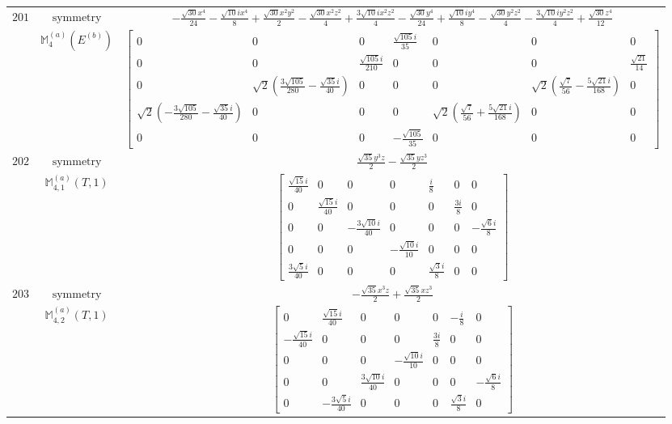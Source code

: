 \documentclass[fleqn,8pt,landscape]{jsarticle}
\begin{document}
\begin{longtable}{ccc}
$ 201 $ & $ \text{symmetry} $ & $ - \frac{\sqrt{30} x^{4}}{24} - \frac{\sqrt{10} i x^{4}}{8} + \frac{\sqrt{30} x^{2} y^{2}}{2} - \frac{\sqrt{30} x^{2} z^{2}}{4} + \frac{3 \sqrt{10} i x^{2} z^{2}}{4} - \frac{\sqrt{30} y^{4}}{24} + \frac{\sqrt{10} i y^{4}}{8} - \frac{\sqrt{30} y^{2} z^{2}}{4} - \frac{3 \sqrt{10} i y^{2} z^{2}}{4} + \frac{\sqrt{30} z^{4}}{12} $ \\
$  $ & $ \mathbb{M}_{4}^{(a)}(E^{(b)}) $ & $ \begin{bmatrix} 0 & 0 & 0 & \frac{\sqrt{105} i}{35} & 0 & 0 & 0 \\ 0 & 0 & \frac{\sqrt{105} i}{210} & 0 & 0 & 0 & \frac{\sqrt{21}}{14} \\ 0 & \sqrt{2} \left(\frac{3 \sqrt{105}}{280} - \frac{\sqrt{35} i}{40}\right) & 0 & 0 & 0 & \sqrt{2} \left(\frac{\sqrt{7}}{56} - \frac{5 \sqrt{21} i}{168}\right) & 0 \\ \sqrt{2} \left(- \frac{3 \sqrt{105}}{280} - \frac{\sqrt{35} i}{40}\right) & 0 & 0 & 0 & \sqrt{2} \left(\frac{\sqrt{7}}{56} + \frac{5 \sqrt{21} i}{168}\right) & 0 & 0 \\ 0 & 0 & 0 & - \frac{\sqrt{105}}{35} & 0 & 0 & 0 \end{bmatrix} $ \\ \hline
$ 202 $ & $ \text{symmetry} $ & $ \frac{\sqrt{35} y^{3} z}{2} - \frac{\sqrt{35} y z^{3}}{2} $ \\
$  $ & $ \mathbb{M}_{4,1}^{(a)}(T,1) $ & $ \begin{bmatrix} \frac{\sqrt{15} i}{40} & 0 & 0 & 0 & \frac{i}{8} & 0 & 0 \\ 0 & \frac{\sqrt{15} i}{40} & 0 & 0 & 0 & \frac{3 i}{8} & 0 \\ 0 & 0 & - \frac{3 \sqrt{10} i}{40} & 0 & 0 & 0 & - \frac{\sqrt{6} i}{8} \\ 0 & 0 & 0 & - \frac{\sqrt{10} i}{10} & 0 & 0 & 0 \\ \frac{3 \sqrt{5} i}{40} & 0 & 0 & 0 & \frac{\sqrt{3} i}{8} & 0 & 0 \end{bmatrix} $ \\ \hline
$ 203 $ & $ \text{symmetry} $ & $ - \frac{\sqrt{35} x^{3} z}{2} + \frac{\sqrt{35} x z^{3}}{2} $ \\
$  $ & $ \mathbb{M}_{4,2}^{(a)}(T,1) $ & $ \begin{bmatrix} 0 & \frac{\sqrt{15} i}{40} & 0 & 0 & 0 & - \frac{i}{8} & 0 \\ - \frac{\sqrt{15} i}{40} & 0 & 0 & 0 & \frac{3 i}{8} & 0 & 0 \\ 0 & 0 & 0 & - \frac{\sqrt{10} i}{10} & 0 & 0 & 0 \\ 0 & 0 & \frac{3 \sqrt{10} i}{40} & 0 & 0 & 0 & - \frac{\sqrt{6} i}{8} \\ 0 & - \frac{3 \sqrt{5} i}{40} & 0 & 0 & 0 & \frac{\sqrt{3} i}{8} & 0 \end{bmatrix} $ \\ \hline

\end{longtable}
\end{document}
